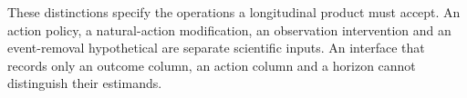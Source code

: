 These distinctions specify the operations a longitudinal product must
accept. An action policy, a natural-action modification, an
observation intervention and an event-removal hypothetical are separate
scientific inputs. An interface that records only an outcome column,
an action column and a horizon cannot distinguish their estimands.
